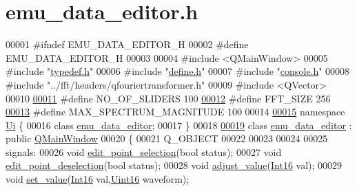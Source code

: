 \hypertarget{a00036_source}{\section{emu\+\_\+data\+\_\+editor.\+h}
\label{a00036_source}
}

\begin{DoxyCode}
00001 \textcolor{preprocessor}{#ifndef EMU\_DATA\_EDITOR\_H}
00002 \textcolor{preprocessor}{#define EMU\_DATA\_EDITOR\_H}
00003 
00004 \textcolor{preprocessor}{#include <QMainWindow>}
00005 \textcolor{preprocessor}{#include "\hyperlink{a00001}{typedef.h}"}
00006 \textcolor{preprocessor}{#include "\hyperlink{a00034}{define.h}"}
00007 \textcolor{preprocessor}{#include "\hyperlink{a00033}{console.h}"}
00008 \textcolor{preprocessor}{#include "../fft/headers/qfouriertransformer.h"}
00009 \textcolor{preprocessor}{#include <QVector>}
00010 
\hypertarget{a00036_source_l00011}{}\hyperlink{a00036_a958de936b60eb9d784cdb10be7d39373}{00011} \textcolor{preprocessor}{#define     NO\_OF\_SLIDERS            100}
\hypertarget{a00036_source_l00012}{}\hyperlink{a00036_a636ddc19af00bc87969a07c88331f105}{00012} \textcolor{preprocessor}{#define     FFT\_SIZE                 256}
\hypertarget{a00036_source_l00013}{}\hyperlink{a00036_a60ece807960441ee99b05b2e536cad76}{00013} \textcolor{preprocessor}{#define     MAX\_SPECTRUM\_MAGNITUDE   100}
00014 
\hypertarget{a00036_source_l00015}{}\hyperlink{a00055}{00015} \textcolor{keyword}{namespace }\hyperlink{a00055}{Ui} \{
00016 \textcolor{keyword}{class }\hyperlink{a00005}{emu\_data\_editor};
00017 \}
00018 
\hypertarget{a00036_source_l00019}{}\hyperlink{a00004}{00019} \textcolor{keyword}{class }\hyperlink{a00004}{emu\_data\_editor} : \textcolor{keyword}{public} \hyperlink{a00010}{QMainWindow}
00020 \{
00021     Q\_OBJECT
00022 
00023 
00024 
00025 signals:
00026      \textcolor{keywordtype}{void} \hyperlink{a00004_a9aa2af0c329358fd96f7fb6b7f02bfe1}{edit\_point\_selection}(\textcolor{keywordtype}{bool} status);
00027      \textcolor{keywordtype}{void} \hyperlink{a00004_a2b9629d20c2b97c01bf8486c89fd0148}{edit\_point\_deselection}(\textcolor{keywordtype}{bool} status);
00028      \textcolor{keywordtype}{void} \hyperlink{a00004_a74d292de22b341313df1852cb1033704}{adjust\_value}(\hyperlink{a00001_a3985266aecb120f269789241c170850c}{Int16} val);
00029      \textcolor{keywordtype}{void} \hyperlink{a00004_a9d26460f253a29dd961b20be0afb5358}{set\_value}(\hyperlink{a00001_a3985266aecb120f269789241c170850c}{Int16} val,\hyperlink{a00001_aae7407b021d43f7193a81a58cfb3e297}{Uint16} waveform);

\end{DoxyCode}
